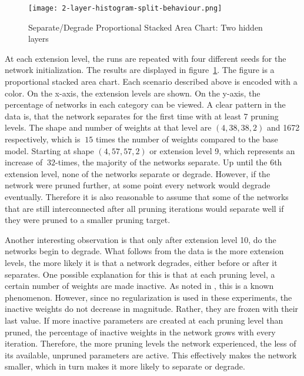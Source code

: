 \begin{figure}[ht] %
    \centering
    \texttt{[image: 2-layer-histogram-split-behaviour.png]}
    \caption{
        Separate/Degrade Proportional Stacked Area Chart: Two hidden layers
        }\label{fig:2laxer-histogram}
\end{figure}

At each extension level, the runs are repeated with four different seeds for the network initialization.
The results are displayed in figure~\ref{fig:2laxer-histogram}.
The figure is a proportional stacked area chart.
Each scenario described above is encoded with a color.
On the x-axis, the extension levels are shown.
On the y-axis, the percentage of networks in each category can be viewed.
A clear pattern in the data is, that the network separates for the first time with at least 7 pruning levels.
The shape and number of weights at that level are $(4,38,38,2)$ and 1672 respectively, which is $~15$ times the number of weights compared to the base model. 
Starting at shape $(4,57,57,2)$ or extension level 9, which represents an increase of $~32$-times, the majority of the networks separate.
Up until the 6th extension level, none of the networks separate or degrade. 
However, if the network were pruned further, at some point every network would degrade eventually.
Therefore it is also reasonable to assume that some of the networks that are still interconnected after all pruning iterations would separate well if they were pruned to a smaller pruning target.

Another interesting observation is that only after extension level 10, do the networks begin to degrade.
What follows from the data is the more extension levels, the more likely it is that a network degrades, either before or after it separates.
One possible explanation for this is that at each pruning level, a certain number of weights are made inactive.
As noted in \autocite{HanEtAl15, AllAlivePruning}, this is a known phenomenon.
However, since no regularization is used in these experiments, the inactive weights do not decrease in magnitude.
Rather, they are frozen with their last value.
If more inactive parameters are created at each pruning level than pruned, the percentage of inactive weights in the network grows with every iteration.
Therefore, the more pruning levels the network experienced, the less of its available, unpruned parameters are active.
This effectively makes the network smaller, which in turn makes it more likely to separate or degrade.


